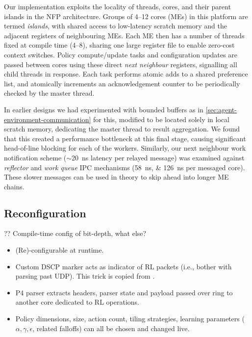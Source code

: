 \documentclass[sigconf,natbib=false]{acmart}
\begin{document}
Our implementation exploits the locality of threads, cores, and their parent islands in the NFP architecture.
Groups of \numrange{4}{12} cores (MEs) in this platform are termed \emph{islands}, with shared access to low-latency scratch memory and the adjacent registers of neighbouring MEs.
Each ME then has a number of threads fixed at compile time (\numrange{4}{8}), sharing one large register file to enable zero-cost context switches.
Policy compute/update tasks and configuration updates are passed between cores using these direct \emph{next neighbour} registers, signalling all child threads in response.
Each task performs atomic adds to a shared preference list, and atomically increments an acknowledgement counter to be periodically checked by the master thread.

In earlier designs we had experimented with bounded buffers as in \cref{sec:agent-environment-communication} for this, modified to be located solely in local scratch memory, dedicating the master thread to result aggregation.
We found that this created a performance bottleneck at this final stage, causing significant head-of-line blocking for each of the workers.
Similarly, our next neighbour work notification scheme ($\sim$\SI{20}{\nano\second} latency per relayed message) was examined against \emph{reflector} and \emph{work queue} IPC mechanisms (\SIlist{58;126}{\nano\second} per messaged core).
These slower messages can be used in theory to skip ahead into longer ME chains.

\subsection{Reconfiguration}
?? Compile-time config of bit-depth, what else?

\begin{itemize}
	\item (Re)-configurable at runtime.
	\item Custom DSCP marker acts as indicator of RL packets (i.e., bother with parsing past UDP). This trick is copied from \textcite{DBLP:conf/isca/LiLYCSH19}.
	\item P4 parser extracts headers, parser state and payload passed over ring to another core dedicated to RL operations.
	\item Policy dimensions, size, action count, tiling strategies, learning parameters ($\alpha, \gamma, \epsilon$, related falloffs) can all be chosen and changed live.
\end{itemize}
\end{document}
